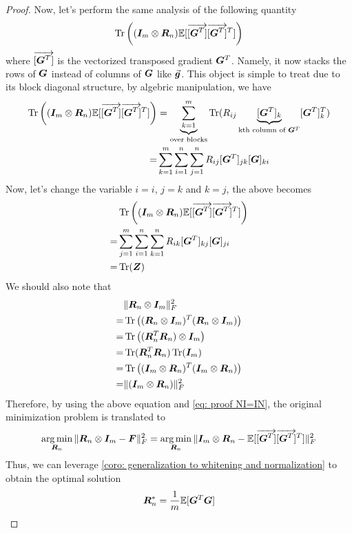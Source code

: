 \begin{proof}
Now, let's perform the same analysis of the following quantity
\begin{align*}
    \operatorname{Tr}\left(({\bm{I}}_m \otimes {\bm{R}}_n)\mathbb{E}[\overrightarrow{[{\bm{G}}^T]}\overrightarrow{[{\bm{G}}^T]}^T]\right)
\end{align*}
where $\overrightarrow{[{\bm{G}}^T]}$ is the vectorized transposed gradient ${\bm{G}}^T$. Namely, it now stacks the rows of ${\bm{G}}$ instead of columns of ${\bm{G}}$ like $\vec{\bm{g}}$. This object is simple to treat due to its block diagonal structure, by algebric manipulation, we have
\begin{align*}
    \operatorname{Tr}\left(({\bm{I}}_m\otimes {\bm{R}}_n)\mathbb{E}[\overrightarrow{[{\bm{G}}^T]}\overrightarrow{[{\bm{G}}^T]}^T]\right) &= \underbrace{\sum_{k=1}^m}_{\text{over blocks}}\operatorname{Tr}(R_{ij}\underbrace{[{\bm{G}}^T]_k}_{\text{kth column of }{\bm{G}}^T}[{\bm{G}}^T]_k^T)\\
    =&\sum_{k=1}^m \sum_{i=1}^n \sum_{j=1}^n R_{ij} [{\bm{G}}^T]_{jk}[{\bm{G}}]_{ki}
\end{align*}
Now, let's change the variable $i=i$, $j=k$ and $k=j$, the above becomes
\begin{align}
    &\operatorname{Tr}\left(({\bm{I}}_m\otimes {\bm{R}}_n)\mathbb{E}[\overrightarrow{[{\bm{G}}^T]}\overrightarrow{[{\bm{G}}^T]}^T]\right) \nonumber\\
    =& \sum_{j=1}^m \sum_{i=1}^n \sum_{k=1}^n R_{ik} [{\bm{G}}^T]_{kj}[{\bm{G}}]_{ji} \nonumber\\
    =& \operatorname{Tr}({\bm{Z}}) \label{eq: proof NI=IN}
\end{align}
We should also note that
\begin{align*}
    &\Vert{\bm{R}}_n\otimes {\bm{I}}_m\Vert_F^2\\
    =& \operatorname{Tr}\left(({\bm{R}}_n\otimes {\bm{I}}_m)^T({\bm{R}}_n\otimes {\bm{I}}_m)\right)\\
    =& \operatorname{Tr}\left(({\bm{R}}_n^T{\bm{R}}_n)\otimes {\bm{I}}_m\right)\\
    =& \operatorname{Tr}({\bm{R}}_n^T{\bm{R}}_n)\operatorname{Tr}({\bm{I}}_m)\\
    =&\operatorname{Tr}\left(({\bm{I}}_m\otimes {\bm{R}}_n)^T({\bm{I}}_m\otimes {\bm{R}}_n)\right)\\
    =& \Vert({\bm{I}}_m\otimes {\bm{R}}_n)\Vert_F^2
\end{align*}
Therefore, by using the above equation and \cref{eq: proof NI=IN}, the original minimization problem is translated to 
\begin{align*}
    \operatorname*{arg\,min}_{{\bm{R}}_n} \Vert{\bm{R}}_n\otimes {\bm{I}}_m -{\bm{F}}\Vert_F^2 = \operatorname*{arg\,min}_{{\bm{R}}_n}\Vert{\bm{I}}_m \otimes {\bm{R}}_n -\mathbb{E}[\overrightarrow{[{\bm{G}}^T]}\overrightarrow{[{\bm{G}}^T]}^T]\Vert_F^2
\end{align*}
Thus, we can leverage \cref{coro: generalization to whitening and normalization} to obtain the optimal solution
\begin{align*}
    {\bm{R}}_n^* = \frac{1}{m} \mathbb{E}[{\bm{G}}^T{\bm{G}}]
\end{align*}
\end{proof}

